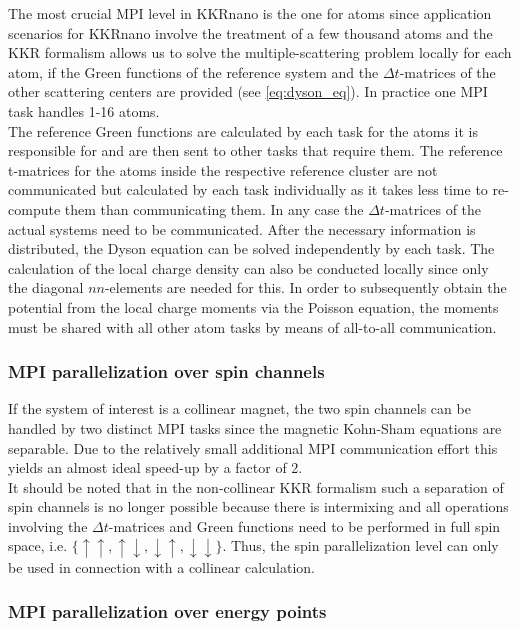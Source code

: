 \documentclass [a4paper, 12pt]{article}
\begin{document}
The most crucial MPI level in KKRnano is the one for atoms since application scenarios for KKRnano
involve the treatment of a few thousand atoms and the KKR formalism allows us to solve the
multiple-scattering problem locally for each atom, if the Green functions of the reference system and
the $\Delta t$-matrices of the other scattering centers are provided (see \cref{eq:dyson_eq}).
In practice one MPI task handles 1-16 atoms.
\\
The reference Green functions are calculated by each task
for the atoms it is responsible for and are then sent to other tasks that require them. 
The reference t-matrices for the atoms inside the respective reference cluster are not communicated 
but calculated by each task individually as it takes less time to re-compute them than communicating them.
In any case the $\Delta t$-matrices of the actual systems need to be communicated.
After the necessary information is distributed, the Dyson equation can be solved independently by each task.
The calculation of the local charge density can also be conducted locally since only the diagonal
$nn$-elements are needed for this.
In order to subsequently obtain the potential from the local charge moments via the Poisson equation,
the moments must be shared with all other atom tasks by means of all-to-all communication.

\subsubsection*{MPI parallelization over spin channels}

If the system of interest is a collinear magnet, the two spin channels can be handled by two distinct
MPI tasks since the
magnetic Kohn-Sham equations are separable.
Due to the relatively small additional MPI communication effort
this yields an almost ideal speed-up by a factor of 2.
\\
It should be noted that in the non-collinear KKR formalism such a 
separation of spin channels is no longer possible because 
there is intermixing and all operations involving the
$\Delta t$-matrices and Green functions
need to be performed in full spin space, i.e. $\{\uparrow \uparrow, \uparrow \downarrow,
\downarrow \uparrow, \downarrow \downarrow \}$.
Thus, the spin parallelization level can only be used in connection with
a collinear calculation.


\subsubsection*{MPI parallelization over energy points}
\end{document}
